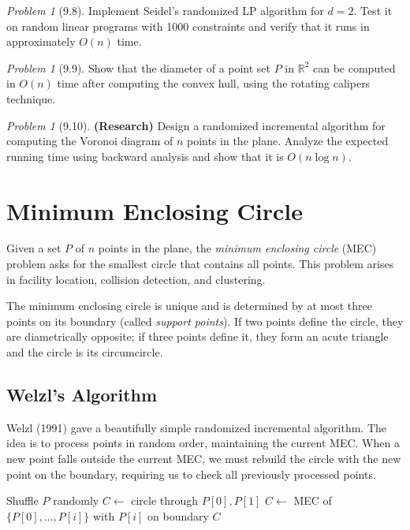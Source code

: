 \documentclass[twoside,12pt]{book}
\theoremstyle{plain}
\theoremstyle{definition}
\theoremstyle{remark}
\newtheorem{problem}[theorem]{Problem}
\begin{document}
\begin{problem}[9.8]
Implement Seidel's randomized LP algorithm for $d = 2$. Test it on random linear programs with 1000 constraints and verify that it runs in approximately $O(n)$ time.
\end{problem}

\begin{problem}[9.9]
Show that the diameter of a point set $P$ in $\mathbb{R}^2$ can be computed in $O(n)$ time after computing the convex hull, using the rotating calipers technique.
\end{problem}

\begin{problem}[9.10]
\textbf{(Research)} Design a randomized incremental algorithm for computing the Voronoi diagram of $n$ points in the plane. Analyze the expected running time using backward analysis and show that it is $O(n \log n)$.
\end{problem}

\section{Minimum Enclosing Circle}
\label{sec:welzl-mec}

Given a set $P$ of $n$ points in the plane, the \emph{minimum enclosing circle} (MEC) problem asks for the smallest circle that contains all points. This problem arises in facility location, collision detection, and clustering.

The minimum enclosing circle is unique and is determined by at most three points on its boundary (called \emph{support points}). If two points define the circle, they are diametrically opposite; if three points define it, they form an acute triangle and the circle is its circumcircle.

\subsection{Welzl's Algorithm}

Welzl (1991) gave a beautifully simple randomized incremental algorithm. The idea is to process points in random order, maintaining the current MEC. When a new point falls outside the current MEC, we must rebuild the circle with the new point on the boundary, requiring us to check all previously processed points.

\begin{algorithm}[htbp]
\caption{Welzl's Minimum Enclosing Circle}
\label{alg:welzl}
\begin{algorithmic}[1]
 
  \State Shuffle $P$ randomly
  \State $C \gets$ circle through $P[0], P[1]$ 
      \State $C \gets$ MEC of $\{P[0], \ldots, P[i]\}$ with $P[i]$ on boundary
    \EndIf
  \EndFor
  \State \Return $C$
\EndFunction
\end{algorithmic}
\end{algorithm}
\end{document}
